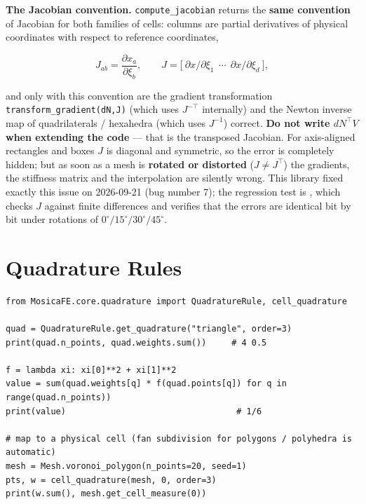 \documentclass[11pt,oneside]{book}
\theoremstyle{definition}
\theoremstyle{plain}
\newenvironment{caution}{%
  \begin{tcolorbox}[colback=orange!5,colframe=orange!55,title=Caution,fonttitle=\bfseries]%
}{%
  \end{tcolorbox}%
}
\newcommand{\code}[1]{\texttt{#1}}
\begin{document}
\begin{caution}
\textbf{The Jacobian convention.} \code{compute\_\allowbreak jacobian} returns the
\textbf{same convention} of Jacobian for both families of cells: columns are partial
derivatives of physical coordinates with respect to reference coordinates,

\begin{equation}
J_{ab}=\frac{\partial x_a}{\partial\xi_b},
\qquad
J=\big[\ \partial x/\partial\xi_1\ \ \cdots\ \ \partial x/\partial\xi_d\ \big],
\label{eq:jac-convention}
\end{equation}

and only with this convention are the gradient transformation
\code{transform\_\allowbreak gradient(dN,\allowbreak  J)} (which uses $J^{-\top}$ internally) and the Newton
inverse map of quadrilaterals / hexahedra (which uses $J^{-1}$) correct.
\textbf{Do not write $dN^{\top}V$ when extending the code} --- that is the transposed
Jacobian. For axis-aligned rectangles and boxes $J$ is diagonal and symmetric, so
the error is completely hidden; but as soon as a mesh is \textbf{rotated or
distorted} ($J\ne J^{\top}$) the gradients, the stiffness matrix and the
interpolation are silently wrong. This library fixed exactly this issue on
2026-09-21 (bug number 7); the regression test is
, which checks $J$ against finite differences
and verifies that the errors are identical bit by bit under rotations of
$0^\circ/15^\circ/30^\circ/45^\circ$.
\end{caution}

\section{Quadrature Rules}

\begin{lstlisting}[language=MosicaFE,caption={Using quadrature rules}]
from MosicaFE.core.quadrature import QuadratureRule, cell_quadrature

quad = QuadratureRule.get_quadrature("triangle", order=3)
print(quad.n_points, quad.weights.sum())     # 4 0.5

f = lambda xi: xi[0]**2 + xi[1]**2
value = sum(quad.weights[q] * f(quad.points[q]) for q in range(quad.n_points))
print(value)                                  # 1/6

# map to a physical cell (fan subdivision for polygons / polyhedra is automatic)
mesh = Mesh.voronoi_polygon(n_points=20, seed=1)
pts, w = cell_quadrature(mesh, 0, order=3)
print(w.sum(), mesh.get_cell_measure(0))
\end{lstlisting}
\end{document}

